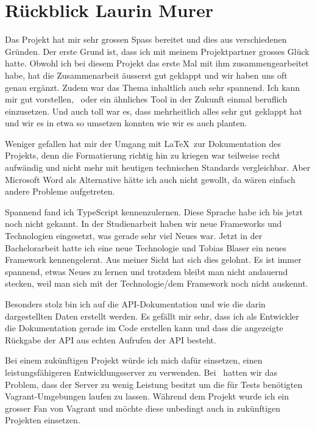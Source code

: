 \section*{Rückblick Laurin Murer}
	Das Projekt hat mir sehr grossen Spass bereitet und dies aus verschiedenen Gründen.
	Der erste Grund ist, dass ich mit meinem Projektpartner grosses Glück hatte.
	Obwohl ich bei diesem Projekt das erste Mal mit ihm zusammengearbeitet habe,
	hat die Zusammenarbeit äusserst gut geklappt und wir haben uns oft genau ergänzt.
	Zudem war das Thema inhaltlich auch sehr spannend.
	Ich kann mir gut vorstellen, \eeppi\ oder ein ähnliches Tool in der Zukunft einmal beruflich einzusetzen.
	Und auch toll war es, dass mehrheitlich alles sehr gut geklappt hat und wir es in etwa so umsetzen konnten wie wir es auch planten.
	
	Weniger gefallen hat mir der Umgang mit \LaTeX\ zur Dokumentation des Projekts,
	denn die Formatierung richtig hin zu kriegen war teilweise recht aufwändig
	und nicht mehr mit heutigen technischen Standards vergleichbar.
	Aber Microsoft Word als Alternative hätte ich auch nicht gewollt, da wären einfach andere Probleme aufgetreten.
	
	Spannend fand ich TypeScript kennenzulernen. Diese Sprache habe ich bis jetzt noch nicht gekannt.
	In der Studienarbeit haben wir neue Frameworks und Technologien eingesetzt, was gerade sehr viel Neues war.
	Jetzt in der Bachelorarbeit hatte ich eine neue Technologie und Tobias Blaser ein neues Framework kennengelernt.
	Aus meiner Sicht hat sich dies gelohnt. Es ist immer spannend, etwas Neues zu lernen
	und trotzdem bleibt man nicht andauernd stecken, weil man sich mit der Technologie/dem Framework noch nicht auskennt.
	
	Besonders stolz bin ich auf die API-Dokumentation und wie die darin dargestellten Daten erstellt werden.
	Es gefällt mir sehr, dass ich als Entwickler die Dokumentation gerade im Code erstellen kann
	und dass die angezeigte Rückgabe der API aus echten Aufrufen der API besteht.
	
	Bei einem zukünftigen Projekt würde ich mich dafür einsetzen,
	einen leistungsfähigeren Entwicklungsserver zu verwenden.
	Bei \eeppi\ hatten wir das Problem, dass der Server zu wenig Leistung besitzt um die für Tests benötigten Vagrant-Umgebungen laufen zu lassen.
	Während dem Projekt wurde ich ein grosser Fan von Vagrant und möchte diese unbedingt auch in zukünftigen Projekten einsetzen.
